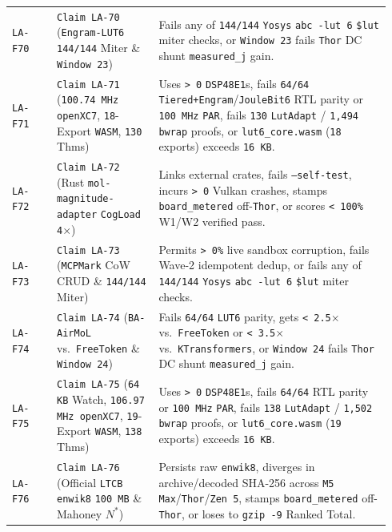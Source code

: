 \documentclass[10pt]{article}
\begin{document}
{\begin{longtable}{@{}L{0.11\linewidth}L{0.25\linewidth}L{0.58\linewidth}@{}}
\texttt{LA-F70} & \texttt{Claim LA-70} (\texttt{Engram-LUT6} \texttt{144/144} Miter \& \texttt{Window 23}) & Fails any of \texttt{144/144} \texttt{Yosys} \texttt{abc -lut 6} \texttt{\$lut} miter checks, or \texttt{Window 23} fails \texttt{Thor} DC shunt \texttt{measured\_j} gain. \\
\texttt{LA-F71} & \texttt{Claim LA-71} (\texttt{100.74 MHz openXC7}, \texttt{18}-Export \texttt{WASM}, \texttt{130} Thms) & Uses \texttt{> 0} \texttt{DSP48E1}s, fails \texttt{64/64} \texttt{Tiered+Engram}/\texttt{JouleBit6} RTL parity or \texttt{100 MHz} \texttt{PAR}, fails \texttt{130} \texttt{LutAdapt} / \texttt{1,494} \texttt{bwrap} proofs, or \texttt{lut6\_core.wasm} (\texttt{18} exports) exceeds \texttt{16 KB}. \\
\texttt{LA-F72} & \texttt{Claim LA-72} (Rust \texttt{mol-magnitude-adapter} \texttt{CogLoad 4$\times$}) & Links external crates, fails \texttt{--self-test}, incurs \texttt{> 0} Vulkan crashes, stamps \texttt{board\_metered} off-\texttt{Thor}, or scores \texttt{< 100\%} W1/W2 verified pass. \\
\texttt{LA-F73} & \texttt{Claim LA-73} (\texttt{MCPMark} CoW CRUD \& \texttt{144/144} Miter) & Permits \texttt{> 0\%} live sandbox corruption, fails Wave-2 idempotent dedup, or fails any of \texttt{144/144} \texttt{Yosys} \texttt{abc -lut 6} \texttt{\$lut} miter checks. \\
\texttt{LA-F74} & \texttt{Claim LA-74} (\texttt{BA-AirMoL} vs.\ \texttt{FreeToken} \& \texttt{Window 24}) & Fails \texttt{64/64} \texttt{LUT6} parity, gets \texttt{< 2.5$\times$} vs.\ \texttt{FreeToken} or \texttt{< 3.5$\times$} vs.\ \texttt{KTransformers}, or \texttt{Window 24} fails \texttt{Thor} DC shunt \texttt{measured\_j} gain. \\
\texttt{LA-F75} & \texttt{Claim LA-75} (\texttt{64 KB} Watch, \texttt{106.97 MHz openXC7}, \texttt{19}-Export \texttt{WASM}, \texttt{138} Thms) & Uses \texttt{> 0} \texttt{DSP48E1}s, fails \texttt{64/64} RTL parity or \texttt{100 MHz} \texttt{PAR}, fails \texttt{138} \texttt{LutAdapt} / \texttt{1,502} \texttt{bwrap} proofs, or \texttt{lut6\_core.wasm} (\texttt{19} exports) exceeds \texttt{16 KB}. \\
\texttt{LA-F76} & \texttt{Claim LA-76} (Official \texttt{LTCB} \texttt{enwik8} \texttt{100 MB} \& Mahoney $N^*$) & Persists raw \texttt{enwik8}, diverges in archive/decoded SHA-256 across \texttt{M5 Max}/\texttt{Thor}/\texttt{Zen 5}, stamps \texttt{board\_metered} off-\texttt{Thor}, or loses to \texttt{gzip -9} Ranked Total. \\

\end{longtable}}
\end{document}

